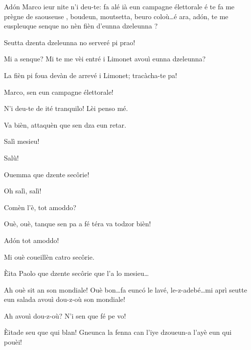 \begin{drama}



\Cimaspeaks Ad\'on Marco ieur nite n'i deu-te: fa alé ià eun campagne élettorale é te fa me prègne de saouseuse \salan, boudeun, moutsetta, beuro coloù\ldots é ara, ad\'on, te me euspleuque senque no nèn fièn d'eunna dzeleunna \gallina ?

\Marcospeaks {} Seutta dzenta dzeleunna  no serveré pi prao!

\Cimaspeaks  Mi a senque? Mi te me vèi entré i Limonet avouì eunna dzeleunna?

\Marcospeaks La fièn pi foua devàn de arrevé i Limonet; tracàcha-te pa!

\Cimaspeaks Marco, sen eun campagne élettorale!

\Marcospeaks N'i deu-te de ité tranquilo! Lèi penso mé.

\Cimaspeaks  Va bièn, attaquèn que sen dza eun retar.


\Cimaspeaks Salì mesieu!

\Pompiolenspeaks Salù!

\Marcospeaks Ouemma que dzente sec\^orie!

\Pompiolenspeaks Oh salì, salì!

\Cimaspeaks Comèn l'è, tot amoddo?

\Pompiolenspeaks Ouè, ouè, tanque sen pa a fé téra va todzor bièn!

\Cimaspeaks Ad\'on tot amoddo!

\Pompiolenspeaks Mi ouè coueillèn catro sec\^orie.

\Marcospeaks Èita Paolo que dzente sec\^orie que l'a lo mesieu\ldots

\Pompiolenspeaks Ah ouè sit an son mondiale! Ouè bon\ldots fa eunc\'o le lavé, le-z-adebé\ldots mi aprì seutte eun salada avouì dou-z-où \ou son mondiale!

\Marcospeaks Ah avouì dou-z-où? N'i sen que fé pe vo!


\Pompiolenspeaks {} Èitade seu que qui blan! Gneunca la fenna can l'iye dzoueun-a l'ayè eun qui pouèi!


\end{drama}

